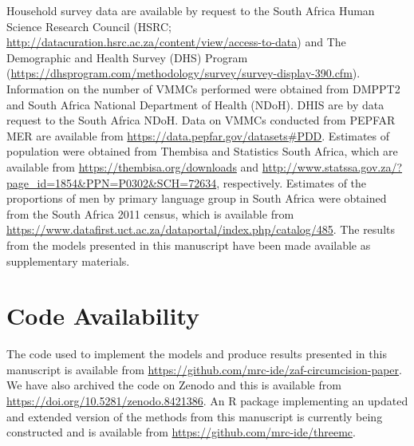 \documentclass{article}
\begin{document}
Household survey data are available by request to the South Africa Human Science Research Council (HSRC; \url{http://datacuration.hsrc.ac.za/content/view/access-to-data}) and The Demographic and Health Survey (DHS) Program (\url{https://dhsprogram.com/methodology/survey/survey-display-390.cfm}). Information on the number of VMMCs performed were obtained from DMPPT2 and South Africa National Department of Health (NDoH). DHIS are by data request to the South Africa NDoH. Data on VMMCs conducted from PEPFAR MER are available from \url{https://data.pepfar.gov/datasets#PDD}. Estimates of population were obtained from Thembisa and Statistics South Africa, which are available from \url{https://thembisa.org/downloads} and \url{http://www.statssa.gov.za/?page_id=1854&PPN=P0302&SCH=72634}, respectively. Estimates of the proportions of men by primary language group in South Africa were obtained from the South Africa 2011 census, which is available from \url{https://www.datafirst.uct.ac.za/dataportal/index.php/catalog/485}. The results from the models presented in this manuscript have been made available as supplementary materials. 


\section*{Code Availability}


The code used to implement the models and produce results presented in this manuscript is available from \url{https://github.com/mrc-ide/zaf-circumcision-paper}. We have also archived the code on Zenodo and this is available from \url{https://doi.org/10.5281/zenodo.8421386}.  An R package implementing an updated and extended version of the methods from this manuscript is currently being constructed and is available from \url{https://github.com/mrc-ide/threemc}.

\end{document}
